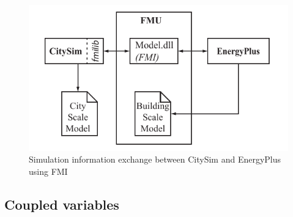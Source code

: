 \documentclass{tBPS2e}
\theoremstyle{plain}
\theoremstyle{definition}
\theoremstyle{remark}
\begin{document}
\begin{figure}[H]
\centering
\includegraphics[scale=0.7]{figures/UMEM_FMU_Overview}
\caption{Simulation information exchange between CitySim and EnergyPlus using FMI \citep{thomas2014multiscale}}
\label{fig:FMUOverview}
\end{figure}



\subsection{Coupled variables}
\end{document}
